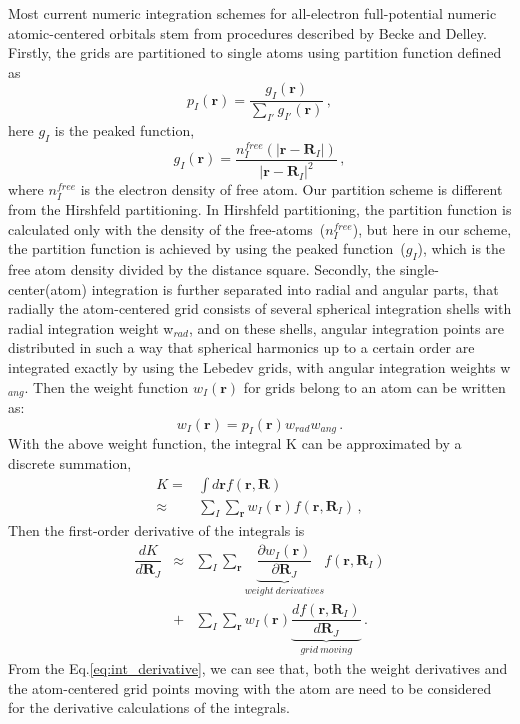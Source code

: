 \documentclass[journal=jpca,manuscript=article]{achemso}
\begin{document}
Most current numeric integration schemes for all-electron full-potential numeric atomic-centered orbitals stem from procedures described by Becke\cite{Becke1988} and Delley\cite{Delley-partition,Delley-aug}. Firstly, the grids are partitioned to single atoms using partition function defined\cite{Delley-partition,Blum2009} as 
\begin{equation}
p_{I}(\mathbf{r})=\dfrac{g_{I}(\mathbf{r})}{\sum_{I'}g_{I'}(\mathbf{r})} \,,
\end{equation}
here $g_{I}$ is the peaked function\cite{Delley-partition},
\begin{equation}
g_{I}(\mathbf{r})=\dfrac{n_{I}^{free}(|\mathbf{r}-\mathbf{R}_I|)}{|\mathbf{r}-\mathbf{R}_I|^2 } \,,
\end{equation}
where $n_{I}^{free}$ is the electron density of free atom. Our partition scheme is different from the Hirshfeld partitioning\cite{Hirshfeld1977}. In Hirshfeld partitioning, the partition function is calculated only with the density of the free-atoms~($n_{I}^{free}$), but here in our scheme, the partition function is achieved by using the peaked function~($g_{I}$), which is the free atom density divided by the distance square. Secondly, the single-center(atom) integration is further separated into radial and angular parts, that 
radially the atom-centered grid consists of several spherical integration shells with radial integration weight w$_{rad}$\cite{Blum2009,Baker1994}, and on these
shells, angular integration points are distributed in such a way that spherical harmonics up to a certain order are integrated exactly by using the Lebedev grids\cite{Delley-aug}, with angular integration weights
w$_{ang}$. 
Then the weight function $w_I(\mathbf{r})$ for grids belong to an atom can be written as:
\begin{equation}
w_I(\mathbf{r})=p_{I}(\mathbf{r})w_{rad}w_{ang} \,.
\end{equation}
With the above weight function, the integral K can be approximated by a discrete summation, 
\begin{eqnarray}
K   = & \int d\mathbf{r} f(\mathbf{r}, \mathbf{R} ) \nonumber \\
  \approx  & \sum_{I} \sum_{\mathbf{r}}  w_I(\mathbf{r})
f(\mathbf{r}, \mathbf{R}_{I}) \,,
\end{eqnarray}
Then the first-order derivative of the integrals is 
\begin{eqnarray}
\dfrac{d K }{d \mathbf{R}_{J} }  & 
 \approx & \sum_{I} \sum_{\mathbf{r}}
\underbrace{ \dfrac{\partial  w_I(\mathbf{r})}{\partial \mathbf{R}_{J}} }_{weight \ derivatives} f(\mathbf{r}, \mathbf{R}_{I})  \nonumber \\
&  + & \sum_{I} \sum_{\mathbf{r}} w_{I}(\mathbf{r})
\underbrace{ \dfrac{d  f(\mathbf{r}, \mathbf{R}_{I})}{d \mathbf{R}_{J}} }_{grid\ moving } \,.
\label{eq:int_derivative}
\end{eqnarray}
From the Eq.\ref{eq:int_derivative}, we can see that, both the weight derivatives and the atom-centered grid points moving with the atom are
need to be considered for the derivative calculations of the integrals.
\end{document}

